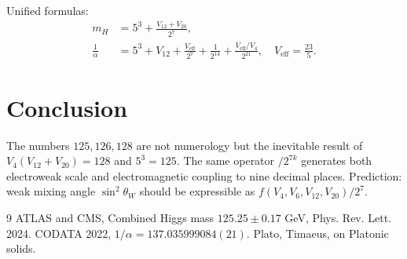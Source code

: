 \documentclass[12pt,a4paper]{article}
\begin{document}
Unified formulas:
\begin{align}
m_H &=5^3+\frac{V_{12}+V_{20}}{2^7},\\
\frac{1}{\alpha} &=5^3+V_{12}+\frac{V_{\text{eff}}}{2^7}+\frac{1}{2^{14}}+\frac{V_{\text{eff}}/V_4}{2^{21}},\quad V_{\text{eff}}=\frac{23}{5}.
\end{align}

\section{Conclusion}
The numbers $125,126,128$ are not numerology but the inevitable result of $V_4(V_{12}+V_{20})=128$ and $5^3=125$. The same operator $/2^{7k}$ generates both electroweak scale and electromagnetic coupling to nine decimal places. Prediction: weak mixing angle $\sin^2\theta_W$ should be expressible as $f(V_4,V_6,V_{12},V_{20})/2^7$.

\begin{thebibliography}{9}
 ATLAS and CMS, Combined Higgs mass $125.25\pm0.17$ GeV, Phys. Rev. Lett. 2024.
 CODATA 2022, $1/\alpha=137.035999084(21)$.
 Plato, Timaeus, on Platonic solids.
\end{thebibliography}
\end{document}
